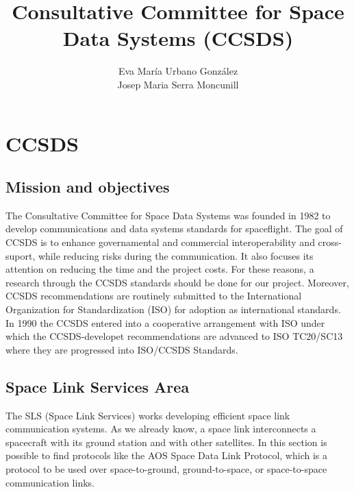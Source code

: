 \documentclass[12pt,a4paper]{report}
\author{Eva María Urbano González\\
Josep Maria Serra Moncunill}
\title{Consultative Committee for Space Data Systems (CCSDS)}
\begin{document}
\maketitle
\section{CCSDS}
\subsection{Mission and objectives}
The Consultative Committee for Space Data Systems was founded in 1982 to develop communications and data systems standards for spaceflight. The goal of CCSDS is to enhance governamental and commercial interoperability and cross-suport, while reducing risks during the communication. It also focuses its attention on reducing the time and the project costs.  For these reasons, a research through the CCSDS standards should be done for our project. Moreover, CCSDS recommendations are routinely submitted to the International Organization for Standardization (ISO) for adoption as international standards. In 1990 the CCSDS entered into a cooperative arrangement with ISO under which the CCSDS-developet recommendations are advanced to ISO TC20/SC13 where they are progressed into ISO/CCSDS Standards. 
\subsection{Space Link Services Area}
The SLS (Space Link Services) works developing efficient space link communication systems. As we already know, a space link interconnects a spacecraft with its ground station and with other satellites. In this section is possible to find protocols like the AOS Space Data Link Protocol, which is a protocol to be used over space-to-ground, ground-to-space, or space-to-space communication links.\cite{CC2006}  
 
\end{document}
